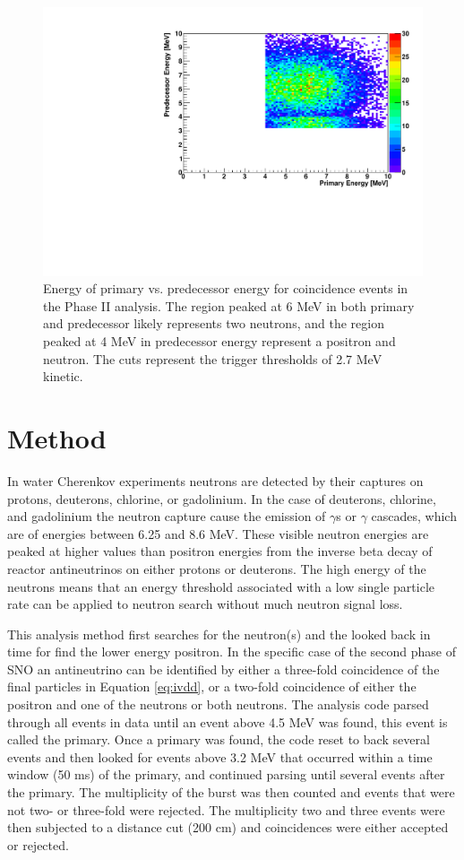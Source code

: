 \documentclass[preprint,12pt]{elsarticle}
\begin{document}
\begin{figure}[ht]
 \centering
\includegraphics[width=14 cm]{eVesalt.pdf}

\caption{Energy of primary vs. predecessor energy for coincidence events in the Phase II analysis.  The region peaked at 6 MeV in both primary and predecessor likely represents two neutrons, and the region peaked at 4 MeV in predecessor energy represent a positron and neutron. The cuts represent the trigger thresholds of 2.7 MeV kinetic. } 
\label{figure:eeS}
\end{figure}

\section{Method}
\label{sec:intro} 
In water Cherenkov experiments neutrons are detected by their captures on protons, deuterons, chlorine, or gadolinium. In the case of deuterons, chlorine, and gadolinium the neutron capture cause the emission of $\gamma$s or $\gamma$ cascades, which are of energies between 6.25 and 8.6 MeV.  These visible neutron energies are peaked at higher values than positron energies from the inverse beta decay of reactor antineutrinos on either protons or deuterons. The high energy of the neutrons means that an energy threshold associated with a low single particle rate can be applied to neutron search without much neutron signal loss. 

This analysis method first searches for the neutron(s) and the looked back in time for find the lower energy positron.  In the specific case of the second phase of SNO an antineutrino can be identified by either a three-fold coincidence of the final particles in Equation \ref{eq:ivdd}, or a two-fold coincidence of either the positron and one of the neutrons or both neutrons.  The analysis code parsed through all events in data until an event above 4.5 MeV was found, this event is called the primary.  Once a primary was found, the code reset to back several events and then looked for events above 3.2 MeV that occurred within a time window (50 ms) of the primary, and continued parsing until several events after the primary. The multiplicity of the burst was then counted and events that were not two- or three-fold were rejected. The multiplicity two and three events were then subjected to a distance cut (200 cm) and coincidences were either accepted or rejected. 
\end{document}
